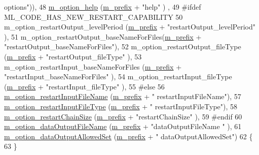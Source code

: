 \begin{DoxyCode}
{       options"})),
48   \hyperlink{class_q_u_e_s_o_1_1_m_l_sampling_options_a5239a6e156de70d1f64b90e5885556d5}{m\_option\_help}                          (\hyperlink{class_q_u_e_s_o_1_1_m_l_sampling_options_a1d3d48598e0b59b46337ce66a52671a5}{m\_prefix} + \textcolor{stringliteral}{"help"}                          )
      ,
49 \textcolor{preprocessor}{#ifdef ML\_CODE\_HAS\_NEW\_RESTART\_CAPABILITY}
50 \textcolor{preprocessor}{}  m\_option\_restartOutput\_levelPeriod     (\hyperlink{class_q_u_e_s_o_1_1_m_l_sampling_options_a1d3d48598e0b59b46337ce66a52671a5}{m\_prefix} + \textcolor{stringliteral}{"restartOutput\_levelPeriod"}     ),
51   m\_option\_restartOutput\_baseNameForFiles(\hyperlink{class_q_u_e_s_o_1_1_m_l_sampling_options_a1d3d48598e0b59b46337ce66a52671a5}{m\_prefix} + \textcolor{stringliteral}{"restartOutput\_baseNameForFiles"}),
52   m\_option\_restartOutput\_fileType        (\hyperlink{class_q_u_e_s_o_1_1_m_l_sampling_options_a1d3d48598e0b59b46337ce66a52671a5}{m\_prefix} + \textcolor{stringliteral}{"restartOutput\_fileType"}        ),
53   m\_option\_restartInput\_baseNameForFiles (\hyperlink{class_q_u_e_s_o_1_1_m_l_sampling_options_a1d3d48598e0b59b46337ce66a52671a5}{m\_prefix} + \textcolor{stringliteral}{"restartInput\_baseNameForFiles"} ),
54   m\_option\_restartInput\_fileType         (\hyperlink{class_q_u_e_s_o_1_1_m_l_sampling_options_a1d3d48598e0b59b46337ce66a52671a5}{m\_prefix} + \textcolor{stringliteral}{"restartInput\_fileType"}         ),
55 \textcolor{preprocessor}{#else}
56 \textcolor{preprocessor}{}  \hyperlink{class_q_u_e_s_o_1_1_m_l_sampling_options_a0fbc7946acb9944500d92503a1a0feaf}{m\_option\_restartInputFileName}          (\hyperlink{class_q_u_e_s_o_1_1_m_l_sampling_options_a1d3d48598e0b59b46337ce66a52671a5}{m\_prefix} + \textcolor{stringliteral}{"
      restartInputFileName"}),
57   \hyperlink{class_q_u_e_s_o_1_1_m_l_sampling_options_a3fa31b5691319385226e2149b549e269}{m\_option\_restartInputFileType}          (\hyperlink{class_q_u_e_s_o_1_1_m_l_sampling_options_a1d3d48598e0b59b46337ce66a52671a5}{m\_prefix} + \textcolor{stringliteral}{"
      restartInputFileType"}),
58   \hyperlink{class_q_u_e_s_o_1_1_m_l_sampling_options_ad37df327253d40983ac3e3ed880069c3}{m\_option\_restartChainSize}              (\hyperlink{class_q_u_e_s_o_1_1_m_l_sampling_options_a1d3d48598e0b59b46337ce66a52671a5}{m\_prefix} + \textcolor{stringliteral}{"restartChainSize"}   
       ),
59 \textcolor{preprocessor}{#endif}
60 \textcolor{preprocessor}{}  \hyperlink{class_q_u_e_s_o_1_1_m_l_sampling_options_a3950ebf354b0ff038c3e0b5c2cc2efa9}{m\_option\_dataOutputFileName}            (\hyperlink{class_q_u_e_s_o_1_1_m_l_sampling_options_a1d3d48598e0b59b46337ce66a52671a5}{m\_prefix} + \textcolor{stringliteral}{"dataOutputFileName
      "}  ),
61   \hyperlink{class_q_u_e_s_o_1_1_m_l_sampling_options_a0dc0efc965101db9b18888c3db5bef99}{m\_option\_dataOutputAllowedSet}          (\hyperlink{class_q_u_e_s_o_1_1_m_l_sampling_options_a1d3d48598e0b59b46337ce66a52671a5}{m\_prefix} + \textcolor{stringliteral}{"
      dataOutputAllowedSet"})
62 \{
63 \}
\end{DoxyCode}
